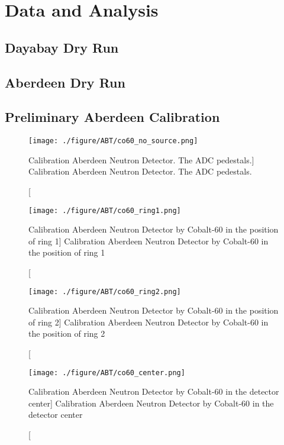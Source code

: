 \chapter {Data and Analysis}
\section {Dayabay Dry Run}
\section {Aberdeen Dry Run}
\section {Preliminary Aberdeen Calibration}

\begin{figure}
    \centering
    \texttt{[image: ./figure/ABT/co60\_no\_source.png]}
    \caption
    [Calibration Aberdeen Neutron Detector. The ADC pedestals.]
    {Calibration Aberdeen Neutron Detector. The ADC pedestals.}
    \label{fig:co60_no_source.png}
    \end{figure}


\begin{figure}
    \centering
    \texttt{[image: ./figure/ABT/co60\_ring1.png]}
    \caption
    [Calibration Aberdeen Neutron Detector by Cobalt-60 in the position of ring 1]
    {Calibration Aberdeen Neutron Detector by Cobalt-60 in the position of ring 1}
    \label{fig:co60_ring1.png}
    \end{figure}

\begin{figure}
    \centering
    \texttt{[image: ./figure/ABT/co60\_ring2.png]}
    \caption
    [Calibration Aberdeen Neutron Detector by Cobalt-60 in the position of ring 2]
    {Calibration Aberdeen Neutron Detector by Cobalt-60 in the position of ring 2}
    \label{fig:co60_ring2.png}
    \end{figure}


\begin{figure}
    \centering
    \texttt{[image: ./figure/ABT/co60\_center.png]}
    \caption
    [Calibration Aberdeen Neutron Detector by Cobalt-60 in the detector center]
    {Calibration Aberdeen Neutron Detector by Cobalt-60 in the detector center}
    \label{fig:co60_ring1.png}
    \end{figure}







